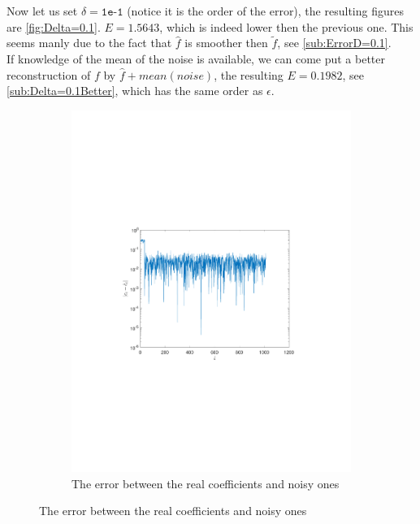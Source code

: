 \documentclass[a4paper]{article}
\begin{document}
	Now let us set $\delta = \texttt{1e-1}$ (notice it is the order of the error), the resulting figures are \cref{fig:Delta=0.1}. $E = 1.5643$, which is indeed lower then the previous one. This seems manly due to the fact that $\hat{f}$ is smoother then $\tilde{f}$, see \cref{sub:ErrorD=0.1}. \\
	If knowledge of the mean of the noise is available, we can come put a better reconstruction of $f$ by $\hat{f}+mean(noise)$, the resulting $E = 0.1982$, see \cref{sub:Delta=0.1Better}, which has the same order as $\epsilon$.

\begin{figure}[H]
	\centering
	\begin{subfigure}{0.49\textwidth}
		\centering
		\includegraphics[trim={4cm 8cm 4cm 8cm},clip,width=1\textwidth]{Images/CoeffDelta=0.pdf}
		\caption{The error between the real coefficients and noisy ones}
		\label{sub:ErrCoeffD=0}
	\end{subfigure}

\end{figure}
\end{document}
